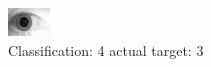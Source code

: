 \begin{figure}[h!]
\begin{center}
\includegraphics[width=0.60\columnwidth]{figures/ID1963_class_4_target_3.png}
\end{center}
\caption{ Classification: 4 actual target: 3}
\label{fig:ID1963_class_4_target_3}
\end{figure}

